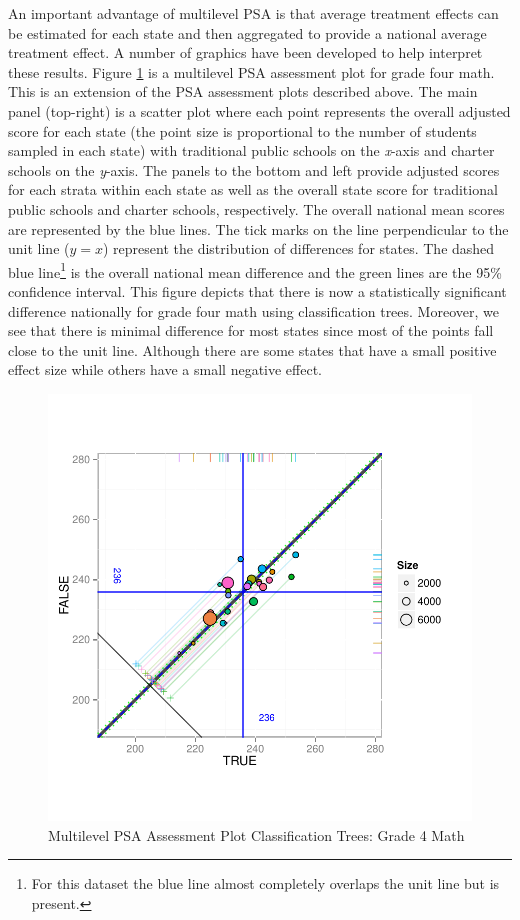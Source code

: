 \documentclass[letterpaper,12p,twoside]{article} %
\begin{document}
An important advantage of multilevel PSA is that average treatment effects can be estimated for each state and then aggregated to provide a national average treatment effect. A number of graphics have been developed to help interpret these results. Figure \ref{fig:g4math-mlpsa-ctree} is a multilevel PSA assessment plot for grade four math. This is an extension of the PSA assessment plots described above. The main panel (top-right) is a scatter plot where each point represents the overall adjusted score for each state (the point size is proportional to the number of students sampled in each state) with traditional public schools on the \textit{x}-axis and charter schools on the \textit{y}-axis. The panels to the bottom and left provide adjusted scores for each strata within each state as well as the overall state score for traditional public schools and charter schools, respectively. The overall national mean scores are represented by the blue lines. The tick marks on the line perpendicular to the unit line ($y = x$) represent the distribution of differences for states. The dashed blue line\footnote{For this dataset the blue line almost completely overlaps the unit line but is present.} is the overall national mean difference and the green lines are the 95\% confidence interval. This figure depicts that there is now a statistically significant difference nationally for grade four math using classification trees. Moreover, we see that there is minimal difference for most states since most of the points fall close to the unit line. Although there are some states that have a small positive effect size while others have a small negative effect. 

\begin{figure}[h]
\begin{center}
\includegraphics[width=\textwidth]{../Figures2009/g4math-mlpsa-ctree-circ.pdf}
\caption{Multilevel PSA Assessment Plot Classification Trees: Grade 4 Math}
\label{fig:g4math-mlpsa-ctree}
\end{center}
\end{figure}
\end{document}
